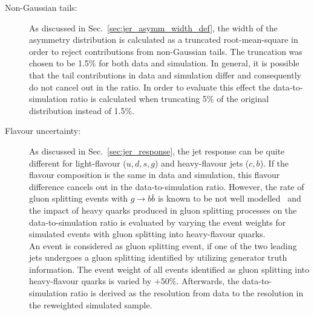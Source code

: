 \begin{description}
\item[Non-Gaussian tails:] As discussed in Sec.~\ref{sec:jer_asymm_width_def}, the width of the asymmetry distribution is calculated as a truncated root-mean-square in order to reject contributions from non-Gaussian tails. The truncation was chosen to be 1.5\% for both data and simulation. In general, it is possible that the tail contributions in data and simulation differ and consequently do not cancel out in the ratio. In order to evaluate this effect the data-to-simulation ratio is calculated when truncating 5\% of the original distribution instead of 1.5\%.  

\item[Flavour uncertainty:] As discussed in Sec.~\ref{sec:jer_response}, the jet response can be quite different for light-flavour ($u,d,s,g$) and heavy-flavour jets ($c,b$). If the flavour composition is the same in data and simulation, this flavour difference cancels out in the data-to-simulation ratio. However, the rate of gluon splitting events with $g \rightarrow b\bar{b}$ is known to be not well modelled~\cite{Khachatryan:2011wq} and the impact of heavy quarks produced in gluon splitting processes on the data-to-simulation ratio is evaluated by varying the event weights for simulated events with gluon splitting into heavy-flavour quarks.\\
An event is considered as gluon splitting event, if one of the two leading jets undergoes a gluon splitting identified by utilizing generator truth information. The event weight of all events identified as gluon splitting into heavy-flavour quarks is varied by $+ 50\%$. Afterwards, the data-to-simulation ratio is derived as the resolution from data to the resolution in the reweighted simulated sample. 


\end{description}
